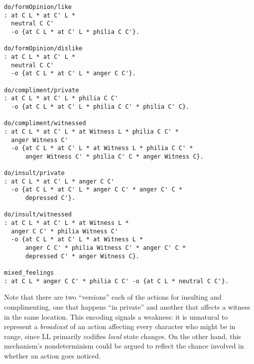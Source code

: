 \documentclass[letterpaper]{article}
\begin{document}
\begin{verbatim}
do/formOpinion/like
: at C L * at C' L *
  neutral C C'
  -o {at C L * at C' L * philia C C'}.

do/formOpinion/dislike
: at C L * at C' L *
  neutral C C'
  -o {at C L * at C' L * anger C C'}.

do/compliment/private
: at C L * at C' L * philia C C' 
  -o {at C L * at C' L * philia C C' * philia C' C}.

do/compliment/witnessed
: at C L * at C' L * at Witness L * philia C C' *
  anger Witness C' 
  -o {at C L * at C' L * at Witness L * philia C C' * 
      anger Witness C' * philia C' C * anger Witness C}.

do/insult/private
: at C L * at C' L * anger C C' 
  -o {at C L * at C' L * anger C C' * anger C' C * 
      depressed C'}.

do/insult/witnessed
: at C L * at C' L * at Witness L * 
  anger C C' * philia Witness C' 
  -o {at C L * at C' L * at Witness L * 
      anger C C' * philia Witness C' * anger C' C * 
      depressed C' * anger Witness C}.

mixed_feelings 
: at C L * anger C C' * philia C C' -o {at C L * neutral C C'}.
\end{verbatim}
Note that there are two ``versions'' each of the actions for insulting and
complimenting, one that happens ``in private'' and another that affects a
witness in the same location. This encoding signals a weakness: it is
unnatural to represent a {\em broadcast} of an action affecting every
character who might be in range, since LL primarily codifies {\em local}
state changes. On the other hand, this mechanism's nondeterminism could be
argued to reflect the chance involved in whether an action goes noticed.
\end{document}
